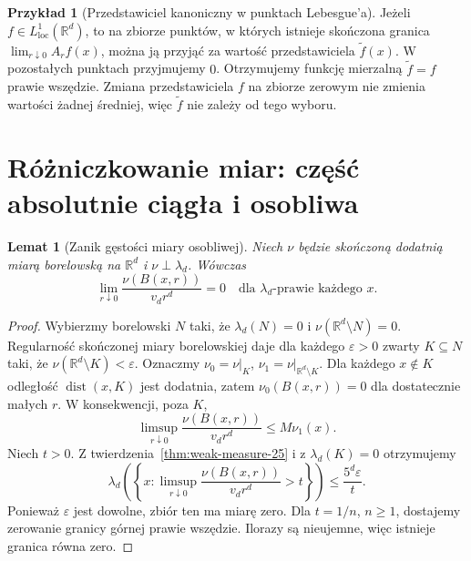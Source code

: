 \documentclass[11pt,a4paper,oneside]{book}
\numberwithin{equation}{chapter}
\theoremstyle{plain}
\newtheorem{lemat}[twierdzenie]{Lemat}
\theoremstyle{definition}
\newtheorem{przyklad}[twierdzenie]{Przykład}
\theoremstyle{remark}
\begin{document}
\begin{przyklad}[Przedstawiciel kanoniczny w punktach Lebesgue'a]
Jeżeli $f\in L^1_{\mathrm{loc}}(\mathbb R^d)$, to
na zbiorze punktów, w których istnieje skończona granica
$\lim_{r\downarrow0}A_rf(x)$, można ją przyjąć za
wartość przedstawiciela $\widetilde f(x)$. W pozostałych
punktach przyjmujemy $0$. Otrzymujemy funkcję mierzalną
$\widetilde f=f$ prawie wszędzie. Zmiana przedstawiciela
$f$ na zbiorze zerowym nie zmienia wartości żadnej średniej,
więc $\widetilde f$ nie zależy od tego wyboru.
\end{przyklad}

\section{Różniczkowanie miar: część absolutnie ciągła i osobliwa}
\begin{lemat}[Zanik gęstości miary osobliwej]
\label{lem:singular-density-25}
Niech $\nu$ będzie skończoną dodatnią miarą borelowską
na $\mathbb R^d$ i $\nu\perp\lambda_d$. Wówczas
\begin{equation}\label{eq:singular-density-25}
 \lim_{r\downarrow0}\frac{\nu(B(x,r))}{v_dr^d}=0
 \quad\text{dla }\lambda_d\text{-prawie każdego }x.
\end{equation}
\end{lemat}
\begin{proof}
Wybierzmy borelowski $N$ taki, że $\lambda_d(N)=0$
i $\nu(\mathbb R^d\setminus N)=0$. Regularność
skończonej miary borelowskiej daje dla każdego
$\varepsilon>0$ zwarty $K\subseteq N$ taki, że
$\nu(\mathbb R^d\setminus K)<\varepsilon$.
Oznaczmy $\nu_0=\nu|_K$, $\nu_1=\nu|_{\mathbb R^d\setminus K}$.
Dla każdego $x\notin K$ odległość $\operatorname{dist}(x,K)$
jest dodatnia, zatem $\nu_0(B(x,r))=0$ dla dostatecznie
małych $r$. W konsekwencji, poza $K$,
\[
 \limsup_{r\downarrow0}\frac{\nu(B(x,r))}{v_dr^d}
 \le M\nu_1(x).
\]
Niech $t>0$. Z twierdzenia~\ref{thm:weak-measure-25}
i z $\lambda_d(K)=0$ otrzymujemy
\[
 \lambda_d\left(\left\{x:\limsup_{r\downarrow0}
 \frac{\nu(B(x,r))}{v_dr^d}>t\right\}\right)
 \le\frac{5^d\varepsilon}{t}.
\]
Ponieważ $\varepsilon$ jest dowolne, zbiór ten ma
miarę zero. Dla $t=1/n$, $n\ge1$, dostajemy
zerowanie granicy górnej prawie wszędzie. Ilorazy są
nieujemne, więc istnieje granica równa zero.
\end{proof}
\end{document}
